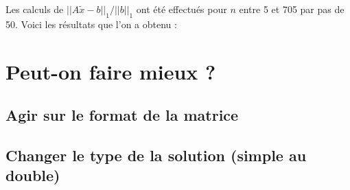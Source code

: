\documentclass[12pt,a4paper]{article}
\begin{document}
	Les calculs de $|\!|A\tilde x -b|\!|_1/|\!|b|\!|_1$ ont été effectués pour $n$ entre 5 et 705 par pas de 50. Voici les résultats que l'on a obtenu :
	
	\datatable
	\pgfplotstabletypeset{\datatable}
	
	
	
	\section{Peut-on faire mieux ?}
	
	\subsection{Agir sur le format de la matrice}
	
	\subsection{Changer le type de la solution (simple au double)}
	
\end{document}
